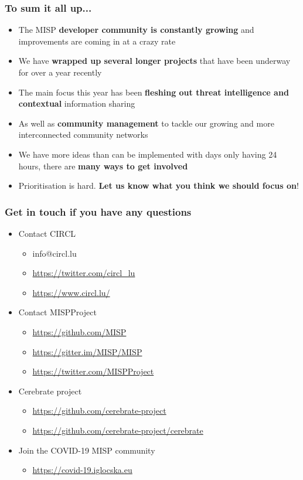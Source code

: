 \begin{frame}
  \frametitle{To sum it all up...}
  \begin{itemize}
     \item The MISP {\bf developer community is constantly growing} and improvements are coming in at a crazy rate
     \item We have {\bf wrapped up several longer projects} that have been underway for over a year recently
     \item The main focus this year has been {\bf fleshing out threat intelligence and contextual} information sharing
     \item As well as {\bf community management} to tackle our growing and more interconnected community networks
     \item We have more ideas than can be implemented with days only having 24 hours, there are {\bf many ways to get involved}
     \item Prioritisation is hard. {\bf Let us know what you think we should focus on}!
  \end{itemize}
\end{frame}

\begin{frame}
  \frametitle{Get in touch if you have any questions}
  \begin{itemize}
    \item Contact CIRCL
    \begin{itemize}
      \item info@circl.lu
      \item \url{https://twitter.com/circl_lu}
      \item \url{https://www.circl.lu/}
    \end{itemize}
    \item Contact MISPProject 
    \begin{itemize}
      \item \url{https://github.com/MISP}
      \item \url{https://gitter.im/MISP/MISP}
      \item \url{https://twitter.com/MISPProject}
    \end{itemize}
    \item Cerebrate project
    \begin{itemize}
      \item \url{https://github.com/cerebrate-project}
      \item \url{https://github.com/cerebrate-project/cerebrate}
    \end{itemize}
    \item Join the COVID-19 MISP community
    \begin{itemize}
      \item \url{https://covid-19.iglocska.eu}
    \end{itemize}
  \end{itemize}
\end{frame}
